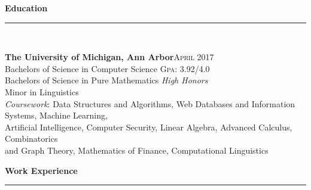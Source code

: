 \documentclass[a4paper,10pt]{article}
\newcommand{\horizontalline}{{\rule{533pt}{0.625pt}\\}}
\renewcommand{\section}[1]{{\noindent\textbf{\large #1}\\\horizontalline}}
\renewcommand{\subsection}[2]{{\noindent \textbf{#1}\hfill \textsc{#2}\\}}
\begin{document}
\par{\par}
\par{\par}
\bigskip
\bigskip

\section{Education}
\subsection{The University of Michigan, Ann Arbor}{April 2017}
Bachelors of Science in Computer Science \hfill \normalsize \textsc{Gpa}: 3.92/4.0\\
Bachelors of Science in Pure Mathematics \hfill \normalsize \textit{High Honors}\\
Minor in Linguistics\\
\textit{Coursework}: Data Structures and Algorithms, Web Databases and Information Systems, Machine Learning,\\
\hphantom{Coursework:::}Artificial Intelligence, Computer Security, Linear Algebra,
Advanced Calculus, Combinatorics\\
\hphantom{Coursework:::}and Graph Theory, Mathematics of Finance, Computational Linguistics\\

\section{Work Experience}
\end{document}
